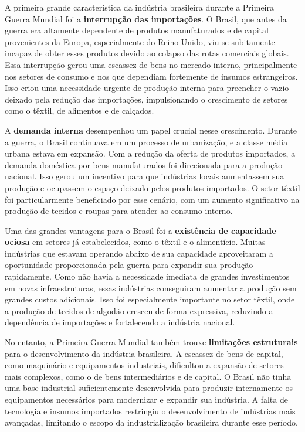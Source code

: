 \documentclass[a4paper,12pt]{article}[abntex2]
\begin{document}
A primeira grande característica da indústria brasileira durante a Primeira Guerra Mundial foi a \textbf{interrupção das importações}. O Brasil, que antes da guerra era altamente dependente de produtos manufaturados e de capital provenientes da Europa, especialmente do Reino Unido, viu-se subitamente incapaz de obter esses produtos devido ao colapso das rotas comerciais globais. Essa interrupção gerou uma escassez de bens no mercado interno, principalmente nos setores de consumo e nos que dependiam fortemente de insumos estrangeiros. Isso criou uma necessidade urgente de produção interna para preencher o vazio deixado pela redução das importações, impulsionando o crescimento de setores como o têxtil, de alimentos e de calçados.

A \textbf{demanda interna} desempenhou um papel crucial nesse crescimento. Durante a guerra, o Brasil continuava em um processo de urbanização, e a classe média urbana estava em expansão. Com a redução da oferta de produtos importados, a demanda doméstica por bens manufaturados foi direcionada para a produção nacional. Isso gerou um incentivo para que indústrias locais aumentassem sua produção e ocupassem o espaço deixado pelos produtos importados. O setor têxtil foi particularmente beneficiado por esse cenário, com um aumento significativo na produção de tecidos e roupas para atender ao consumo interno.

Uma das grandes vantagens para o Brasil foi a \textbf{existência de capacidade ociosa} em setores já estabelecidos, como o têxtil e o alimentício. Muitas indústrias que estavam operando abaixo de sua capacidade aproveitaram a oportunidade proporcionada pela guerra para expandir sua produção rapidamente. Como não havia a necessidade imediata de grandes investimentos em novas infraestruturas, essas indústrias conseguiram aumentar a produção sem grandes custos adicionais. Isso foi especialmente importante no setor têxtil, onde a produção de tecidos de algodão cresceu de forma expressiva, reduzindo a dependência de importações e fortalecendo a indústria nacional.

No entanto, a Primeira Guerra Mundial também trouxe \textbf{limitações estruturais} para o desenvolvimento da indústria brasileira. A escassez de bens de capital, como maquinário e equipamentos industriais, dificultou a expansão de setores mais complexos, como o de bens intermediários e de capital. O Brasil não tinha uma base industrial suficientemente desenvolvida para produzir internamente os equipamentos necessários para modernizar e expandir sua indústria. A falta de tecnologia e insumos importados restringiu o desenvolvimento de indústrias mais avançadas, limitando o escopo da industrialização brasileira durante esse período.
\end{document}
